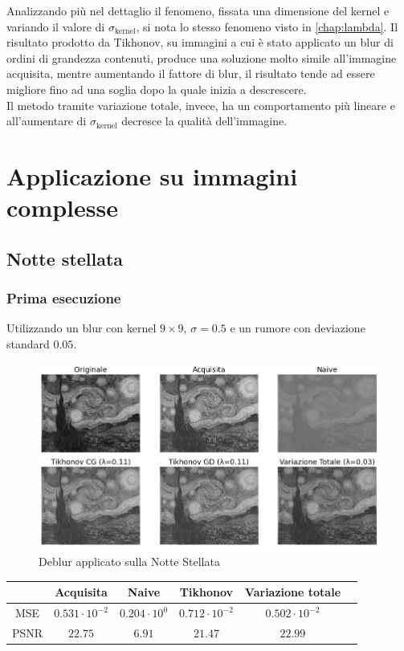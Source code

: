 \documentclass[11pt]{article}
\begin{document}
Analizzando più nel dettaglio il fenomeno, fissata una dimensione del kernel e variando il valore di $\sigma_{\text{kernel}}$, si nota lo stesso fenomeno visto in \autoref{chap:lambda}. 
Il risultato prodotto da Tikhonov, su immagini a cui è stato applicato un blur di ordini di grandezza contenuti, produce una soluzione molto simile all'immagine acquisita, 
mentre aumentando il fattore di blur, il risultato tende ad essere migliore fino ad una soglia dopo la quale inizia a descrescere.\\
Il metodo tramite variazione totale, invece, ha un comportamento più lineare e all'aumentare di $\sigma_{\text{kernel}}$ decresce la qualità dell'immagine.




\newpage
\section{Applicazione su immagini complesse}
\subsection{Notte stellata}
\subsubsection{Prima esecuzione}
Utilizzando un blur con kernel $9 \times 9$, $\sigma=0.5$ e un rumore con deviazione standard $0.05$.
\begin{figure}[H]
    \centering
    \includegraphics[width=15cm]{reale/1/1/deblur.png}
    \caption{Deblur applicato sulla Notte Stellata}
    \label{fig:deblur_reale1_1}
\end{figure}
\begin{center}
    \begin{tabular}{ |c|c|c|c|c|c| }
    \hline
    & Acquisita & Naive & Tikhonov & Variazione totale \\ 
    \hline
    MSE & $0.531 \cdot 10^{-2}$ & $0.204 \cdot 10^{0}$ & $0.712 \cdot 10^{-2}$ & $0.502 \cdot 10^{-2}$ \\ 
    PSNR & $22.75$ & $6.91$ & $21.47$ & $22.99$ \\ 
    \hline
    \end{tabular}
\end{center}
\end{document}

